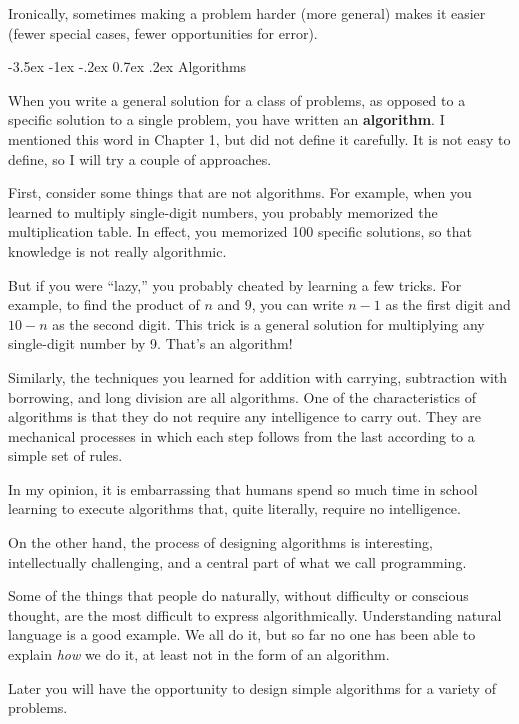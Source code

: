 \documentclass{book}
\makeatletter
\renewcommand{\section}{\@startsection 
    {section} {1} {0mm}%
    {-3.5ex \@plus -1ex \@minus -.2ex}%
    {0.7ex \@plus.2ex}%
    {\normalfont\Large\bfseries}}
\makeatother
\begin{document}
Ironically, sometimes making a problem harder (more general)
makes it easier (fewer special cases, fewer opportunities for error).

\section{Algorithms}
\label{algorithm}

When you write a general solution for a class of problems, as
opposed to a specific solution to a single problem, you have
written an {\bf algorithm}.  I mentioned this word in 
Chapter 1, but did not define it carefully.  It is
not easy to define, so I will try a couple of approaches.

First, consider some things that are not algorithms.  For example,
when you learned to multiply single-digit numbers, you probably
memorized the multiplication table.  In effect, you memorized 100
specific solutions, so that knowledge is not really algorithmic.

But if you were ``lazy,'' you probably cheated by learning a few
tricks.  For example, to find the product of $n$ and 9, you can
write $n-1$ as the first digit and $10-n$ as the second digit.  This
trick is a general solution for multiplying any single-digit number by 9.
That's an algorithm!

Similarly, the techniques you learned for addition with carrying,
subtraction with borrowing, and long division are all algorithms.  One
of the characteristics of algorithms is that they do not require any
intelligence to carry out.  They are mechanical processes in which
each step follows from the last according to a simple set of rules.

In my opinion, it is embarrassing that humans spend so much
time in school learning to execute algorithms that,
quite literally, require no intelligence.

On the other hand, the process of designing algorithms is
interesting, intellectually challenging, and a central part
of what we call programming.

Some of the things that people do naturally, without difficulty
or conscious thought, are the most difficult to express
algorithmically.  Understanding natural language is a good
example.  We all do it, but so far no one has been able to
explain {\em how} we do it, at least not in the form of an
algorithm.

Later you will have the opportunity to design
simple algorithms for a variety of problems.
\end{document}
